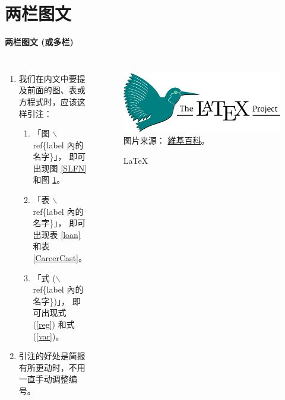 \documentclass[12pt, aspectratio=169]{beamer}
\begin{document}
\section{两栏图文}
\linespread{1}  
\begin{frame}{\textbf{两栏图文 (或多栏)}}
\linespread{1.5} 

	\begin{columns}[c]
			\begin{enumerate}[]
				\item 我们在内文中要提及前面的图、表或方程式时，应该这样引注：
				\begin{enumerate}[]
					\item 「图 $\backslash$ref\{label 內的名字\}」，
						即可出现图 \ref{SLFN} 和图 \ref{LaTeX}。
					\item 「表 $\backslash$ref\{label 內的名字\}」，
						即可出现表 \ref{loan} 和表 \ref{CareerCast}。
					\item 「式 ($\backslash$ref\{label 內的名字\})」，
						即可出现式 (\ref{reg}) 和式 (\ref{var})。
				\end{enumerate}
				\item 引注的好处是简报有所更动时，不用一直手动调整编号。
			\end{enumerate}

			\begin{figure}
				\includegraphics[scale=0.045]{Fig/LaTeX.png}\\
				\scriptsize{图片来源：
				\href{https://en.wikipedia.org/wiki/LaTeX}{維基百科}。}\\
				\caption{\LaTeX}
				\label{LaTeX} 
			\end{figure}
	\end{columns}
\end{frame}


\end{document}
